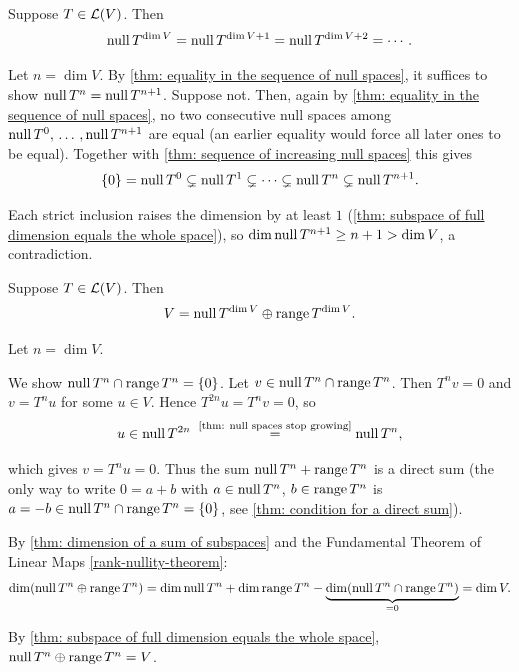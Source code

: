 \begin{thm}
  \label{thm: null spaces stop growing}
  Suppose $T \in \mathcal{L}(V)$. Then
  \begin{equation}
    \operatorname{null} T^{\dim V} = \operatorname{null} T^{\dim V + 1} = \operatorname{null} T^{\dim V + 2} = \cdots.
  \end{equation}
\end{thm}
\begin{prf}
  Let $n = \dim V$. By \ref{thm: equality in the sequence of null spaces}, it suffices to show $\operatorname{null} T^n = \operatorname{null} T^{n+1}$.
  Suppose not. Then, again by \ref{thm: equality in the sequence of null spaces}, no two consecutive null spaces among $\operatorname{null} T^0, {\, \ldots \,\,}, \operatorname{null} T^{n+1}$ are equal (an earlier equality would force all later ones to be equal). Together with \ref{thm: sequence of increasing null spaces} this gives
  \begin{equation}
    \{0\} = \operatorname{null} T^0 \subsetneq \operatorname{null} T^1 \subsetneq \cdots \subsetneq \operatorname{null} T^n \subsetneq \operatorname{null} T^{n+1}.
  \end{equation}

  Each strict inclusion raises the dimension by at least $1$ (\ref{thm: subspace of full dimension equals the whole space}), so $\dim \operatorname{null} T^{n+1} \geq n+1 > \dim V$, a contradiction.
\end{prf}

\begin{thm}
  \label{thm: V is the direct sum of null T^dim V and range T^dim V}
  Suppose $T \in \mathcal{L}(V)$. Then
  \begin{equation}
    V = \operatorname{null} T^{\dim V} \oplus \operatorname{range} T^{\dim V}.
  \end{equation}
\end{thm}
\begin{prf}
  Let $n = \dim V$.

  \StepOne We show $\operatorname{null} T^n \cap \operatorname{range} T^n = \{0\}$. Let $v \in \operatorname{null} T^n \cap \operatorname{range} T^n$. Then $T^n v = 0$ and $v = T^n u$ for some $u \in V$. Hence $T^{2n} u = T^n v = 0$, so
  \begin{equation}
    u \in \operatorname{null} T^{2n} \;\overset{\text{\scriptsize\ref{thm: null spaces stop growing}}}{=} \operatorname{null} T^n,
  \end{equation}

  which gives $v = T^n u = 0$. Thus the sum $\operatorname{null} T^n + \operatorname{range} T^n$ is a direct sum (the only way to write $0 = a + b$ with $a \in \operatorname{null} T^n$, $b \in \operatorname{range} T^n$ is $a = -b \in \operatorname{null} T^n \cap \operatorname{range} T^n = \{0\}$, see \ref{thm: condition for a direct sum}).

  \StepTwo By \ref{thm: dimension of a sum of subspaces} and the Fundamental Theorem of Linear Maps \ref{rank-nullity-theorem}:
  \begin{equation}
    \dim (\operatorname{null} T^n \oplus \operatorname{range} T^n) = \dim \operatorname{null} T^n + \dim \operatorname{range} T^n - \underbrace{\dim (\operatorname{null} T^n \cap \operatorname{range} T^n)}_{=0} = \dim V.
  \end{equation}

  By \ref{thm: subspace of full dimension equals the whole space}, $\operatorname{null} T^n \oplus \operatorname{range} T^n = V$.
\end{prf}

